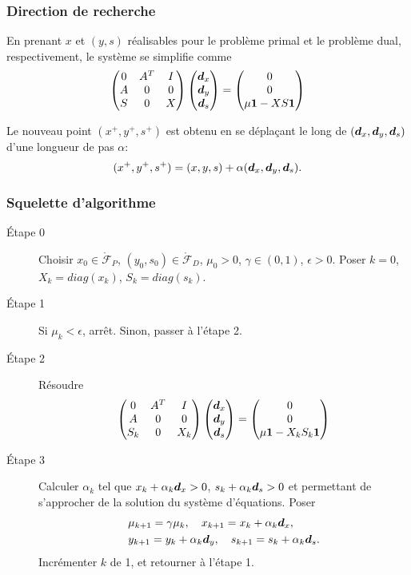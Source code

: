 \documentclass[usepdftitle=false, aspectratio=169]{beamer}
\begin{document}
\begin{frame}
\frametitle{Direction de recherche}

En prenant $x$ et $(y,s)$ réalisables pour le problème primal et le problème dual, respectivement, le système se simplifie comme
$$
\begin{pmatrix}
0 & A^T & I \\
A & 0 & 0 \\
S & 0 & X
\end{pmatrix}
\begin{pmatrix}
{\boldsymbol{d}}_x \\ {\boldsymbol{d}}_y \\ {\boldsymbol{d}}_s
\end{pmatrix}
=
\begin{pmatrix}
0 \\ 0 \\ \mu{\boldsymbol{1}} - XS{\boldsymbol{1}}
\end{pmatrix}
$$

Le nouveau point $(x^+, y^+, s^+)$ est obtenu en se déplaçant le long de $({\boldsymbol{d}}_x, {\boldsymbol{d}}_y, {\boldsymbol{d}}_s)$ d'une longueur de pas $\alpha$:
$$
(x^+, y^+, s^+) = (x, y, s) + \alpha ({\boldsymbol{d}}_x, {\boldsymbol{d}}_y, {\boldsymbol{d}}_s).
$$

\end{frame}

\begin{frame}
\frametitle{Squelette d'algorithme}

\begin{description}
	\item[Étape 0] Choisir $x_0 \in \mathring{\mathcal{F}}_P$, $(y_0, s_0) \in \mathring{\mathcal{F}}_D$, $\mu_0 > 0$, $\gamma \in (0,1)$, $\epsilon > 0$. Poser $k = 0$, $X_k = diag(x_k)$, $S_k = diag(s_k)$.
	\item[Étape 1] Si $\mu_k < \epsilon$, arrêt. Sinon, passer à l'étape 2.
	\item[Étape 2] Résoudre
$$
\begin{pmatrix}
	0 & A^T & I \\
	A & 0 & 0 \\
	S_k & 0 & X_k
\end{pmatrix}
\begin{pmatrix}
	{\boldsymbol{d}}_x \\ {\boldsymbol{d}}_y \\ {\boldsymbol{d}}_s
\end{pmatrix}
=
\begin{pmatrix}
	0 \\ 0 \\ \mu{\boldsymbol{1}} - X_kS_k{\boldsymbol{1}}
\end{pmatrix}
$$
\item[Étape 3] Calculer $\alpha_k$ tel que $x_k + \alpha_k{\boldsymbol{d}}_x > 0$, $s_k + \alpha_k{\boldsymbol{d}}_s > 0$ et permettant de s'approcher de la solution du système d'équations. Poser
\begin{align*}
& \mu_{k+1} = \gamma \mu_k,\quad x_{k+1} = x_k + \alpha_k{\boldsymbol{d}}_x, \\
& y_{k+1} = y_k + \alpha_k{\boldsymbol{d}}_y,\quad s_{k+1} = s_k + \alpha_k{\boldsymbol{d}}_s.
\end{align*}
Incrémenter $k$ de 1, et retourner à l'étape 1.
\end{description}

\end{frame}
\end{document}

